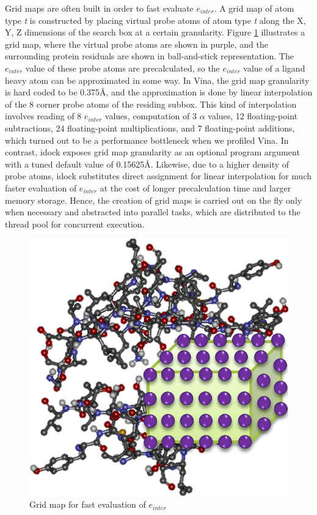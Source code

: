 Grid maps are often built in order to fast evaluate $e_{inter}$. A grid map of atom type \textit{t} is constructed by placing virtual probe atoms of atom type \textit{t} along the X, Y, Z dimensions of the search box at a certain granularity. Figure \ref{idock:GridMap} illustrates a grid map, where the virtual probe atoms are shown in purple, and the surrounding protein residuals are shown in ball-and-stick representation. The $e_{inter}$ value of these probe atoms are precalculated, so the $e_{inter}$ value of a ligand heavy atom can be approximated in some way. In Vina, the grid map granularity is hard coded to be 0.375\AA, and the approximation is done by linear interpolation of the 8 corner probe atoms of the residing subbox. This kind of interpolation involves reading of 8 $e_{inter}$ values, computation of 3 $\alpha$ values, 12 floating-point subtractions, 24 floating-point multiplications, and 7 floating-point additions, which turned out to be a performance bottleneck when we profiled Vina. In contrast, idock exposes grid map granularity as an optional program argument with a tuned default value of 0.15625\AA. Likewise, due to a higher density of probe atoms, idock substitutes direct assignment for linear interpolation for much faster evaluation of $e_{inter}$ at the cost of longer precalculation time and larger memory storage. Hence, the creation of grid maps is carried out on the fly only when necessary and abstracted into parallel tasks, which are distributed to the thread pool for concurrent execution.

\begin{figure}
\centering
\includegraphics[width=\linewidth]{../idock/GridMap.png}
\caption{Grid map for fast evaluation of $e_{inter}$}
\label{idock:GridMap}
\end{figure}

